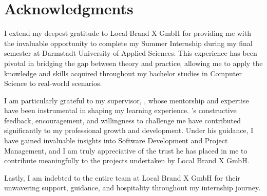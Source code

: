 



\bigskip

\begingroup
\let\clearpage\relax
\let\cleardoublepage\relax
\let\cleardoublepage\relax
\chapter*{Acknowledgments}

I extend my deepest gratitude to Local Brand X GmbH for providing me with the invaluable opportunity to complete my Summer Internship during my final semester at Darmstadt University of Applied Sciences. This experience has been pivotal in bridging the gap between theory and practice, allowing me to apply the knowledge and skills acquired throughout my bachelor studies in Computer Science to real-world scenarios. 

\bigskip

\noindent I am particularly grateful to my supervisor, \mySupervisor, whose mentorship and expertise have been instrumental in shaping my learning experience. \mySupervisor's constructive feedback, encouragement, and willingness to challenge me have contributed significantly to my professional growth and development. Under his guidance, I have gained invaluable insights into Software Development and Project Management, and I am truly appreciative of the trust he has placed in me to contribute meaningfully to the projects undertaken by Local Brand X GmbH.

\bigskip

\noindent Lastly, I am indebted to the entire team at Local Brand X GmbH for their unwavering support, guidance, and hospitality throughout my internship journey.

\endgroup



